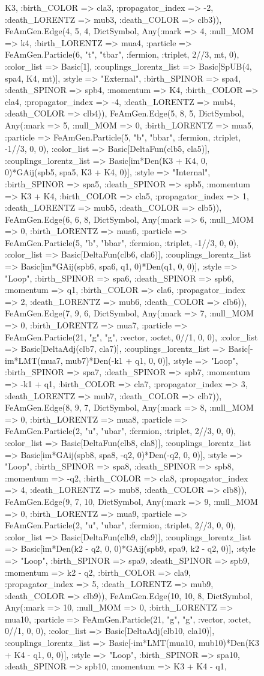 \documentclass{revtex4}
\begin{document}
\begin{figure}[!htb]
\begin{center}
{K3, :birth_COLOR => cla3, :propagator_index => -2, :death_LORENTZ => mub3, :death_COLOR => clb3)), FeAmGen.Edge(4, 5, 4, Dict{Symbol, Any}(:mark => 4, :null_MOM => k4, :birth_LORENTZ => mua4, :particle => FeAmGen.Particle(6, "t", "tbar", :fermion, :triplet, 2//3, mt, 0), :color_list => Basic[1], :couplings_lorentz_list => Basic[SpUB(4, spa4, K4, mt)], :style => "External", :birth_SPINOR => spa4, :death_SPINOR => spb4, :momentum => K4, :birth_COLOR => cla4, :propagator_index => -4, :death_LORENTZ => mub4, :death_COLOR => clb4)), FeAmGen.Edge(5, 8, 5, Dict{Symbol, Any}(:mark => 5, :null_MOM => 0, :birth_LORENTZ => mua5, :particle => FeAmGen.Particle(5, "b", "bbar", :fermion, :triplet, -1//3, 0, 0), :color_list => Basic[DeltaFun(clb5, cla5)], :couplings_lorentz_list => Basic[im*Den(K3 + K4, 0, 0)*GAij(spb5, spa5, K3 + K4, 0)], :style => "Internal", :birth_SPINOR => spa5, :death_SPINOR => spb5, :momentum => K3 + K4, :birth_COLOR => cla5, :propagator_index => 1, :death_LORENTZ => mub5, :death_COLOR => clb5)), FeAmGen.Edge(6, 6, 8, Dict{Symbol, Any}(:mark => 6, :null_MOM => 0, :birth_LORENTZ => mua6, :particle => FeAmGen.Particle(5, "b", "bbar", :fermion, :triplet, -1//3, 0, 0), :color_list => Basic[DeltaFun(clb6, cla6)], :couplings_lorentz_list => Basic[im*GAij(spb6, spa6, q1, 0)*Den(q1, 0, 0)], :style => "Loop", :birth_SPINOR => spa6, :death_SPINOR => spb6, :momentum => q1, :birth_COLOR => cla6, :propagator_index => 2, :death_LORENTZ => mub6, :death_COLOR => clb6)), FeAmGen.Edge(7, 9, 6, Dict{Symbol, Any}(:mark => 7, :null_MOM => 0, :birth_LORENTZ => mua7, :particle => FeAmGen.Particle(21, "g", "g", :vector, :octet, 0//1, 0, 0), :color_list => Basic[DeltaAdj(clb7, cla7)], :couplings_lorentz_list => Basic[-im*LMT(mua7, mub7)*Den(-k1 + q1, 0, 0)], :style => "Loop", :birth_SPINOR => spa7, :death_SPINOR => spb7, :momentum => -k1 + q1, :birth_COLOR => cla7, :propagator_index => 3, :death_LORENTZ => mub7, :death_COLOR => clb7)), FeAmGen.Edge(8, 9, 7, Dict{Symbol, Any}(:mark => 8, :null_MOM => 0, :birth_LORENTZ => mua8, :particle => FeAmGen.Particle(2, "u", "ubar", :fermion, :triplet, 2//3, 0, 0), :color_list => Basic[DeltaFun(clb8, cla8)], :couplings_lorentz_list => Basic[im*GAij(spb8, spa8, -q2, 0)*Den(-q2, 0, 0)], :style => "Loop", :birth_SPINOR => spa8, :death_SPINOR => spb8, :momentum => -q2, :birth_COLOR => cla8, :propagator_index => 4, :death_LORENTZ => mub8, :death_COLOR => clb8)), FeAmGen.Edge(9, 7, 10, Dict{Symbol, Any}(:mark => 9, :null_MOM => 0, :birth_LORENTZ => mua9, :particle => FeAmGen.Particle(2, "u", "ubar", :fermion, :triplet, 2//3, 0, 0), :color_list => Basic[DeltaFun(clb9, cla9)], :couplings_lorentz_list => Basic[im*Den(k2 - q2, 0, 0)*GAij(spb9, spa9, k2 - q2, 0)], :style => "Loop", :birth_SPINOR => spa9, :death_SPINOR => spb9, :momentum => k2 - q2, :birth_COLOR => cla9, :propagator_index => 5, :death_LORENTZ => mub9, :death_COLOR => clb9)), FeAmGen.Edge(10, 10, 8, Dict{Symbol, Any}(:mark => 10, :null_MOM => 0, :birth_LORENTZ => mua10, :particle => FeAmGen.Particle(21, "g", "g", :vector, :octet, 0//1, 0, 0), :color_list => Basic[DeltaAdj(clb10, cla10)], :couplings_lorentz_list => Basic[-im*LMT(mua10, mub10)*Den(K3 + K4 - q1, 0, 0)], :style => "Loop", :birth_SPINOR => spa10, :death_SPINOR => spb10, :momentum => K3 + K4 - q1, }
\end{center}
\end{figure}
\end{document}
